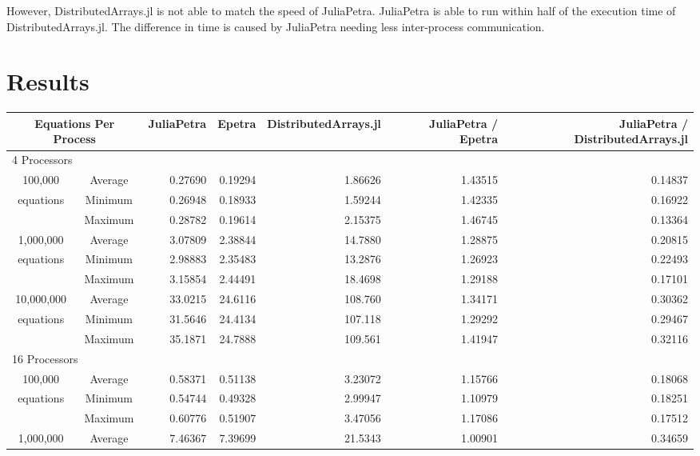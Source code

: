 \documentclass[acmsmall]{acmart}
\begin{document}
However, DistributedArrays.jl is not able to match the speed of JuliaPetra.
JuliaPetra is able to run within half of the execution time of DistributedArrays.jl.
The difference in time is caused by JuliaPetra needing less inter-process communication.

\section{Results}

\begin{table}
\begin{tabular}{|c c|r|r|r||r|r|}
	\hline
		\multicolumn{2}{|c|}{Equations Per Process}
		& JuliaPetra
		& Epetra
		& \multicolumn{1}{m{1.8cm}||}{Distributed\-Arrays.jl}
		& \multicolumn{1}{m{1.75cm}|}{JuliaPetra / Epetra}
		& \multicolumn{1}{m{1.8cm}|}{JuliaPetra / Distributed\-Arrays.jl} \\
	\hline
		\multicolumn{7}{|l|}{4 Processors}\\
	\hline
		100,000			&Average & 0.27690 & 0.19294 & 1.86626 & 1.43515 & 0.14837 \\
		equations		&Minimum & 0.26948 & 0.18933 & 1.59244 & 1.42335 & 0.16922 \\
						&Maximum & 0.28782 & 0.19614 & 2.15375 & 1.46745 & 0.13364 \\
	\hline
		1,000,000		&Average & 3.07809 & 2.38844 & 14.7880 & 1.28875 & 0.20815 \\
		equations		&Minimum & 2.98883 & 2.35483 & 13.2876 & 1.26923 & 0.22493 \\
						&Maximum & 3.15854 & 2.44491 & 18.4698 & 1.29188 & 0.17101 \\
	\hline
		10,000,000		&Average & 33.0215 & 24.6116 & 108.760 & 1.34171 & 0.30362 \\
		equations		&Minimum & 31.5646 & 24.4134 & 107.118 & 1.29292 & 0.29467 \\
						&Maximum & 35.1871 & 24.7888 & 109.561 & 1.41947 & 0.32116 \\
	\hline
		\multicolumn{7}{|l|}{16 Processors}\\
	\hline
		100,000			&Average & 0.58371 & 0.51138 & 3.23072 & 1.15766 & 0.18068 \\
		equations		&Minimum & 0.54744 & 0.49328 & 2.99947 & 1.10979 & 0.18251 \\
						&Maximum & 0.60776 & 0.51907 & 3.47056 & 1.17086 & 0.17512 \\
	\hline
		1,000,000		&Average & 7.46367 & 7.39699 & 21.5343 & 1.00901 & 0.34659 \\

\end{tabular}
\end{table}
\end{document}
